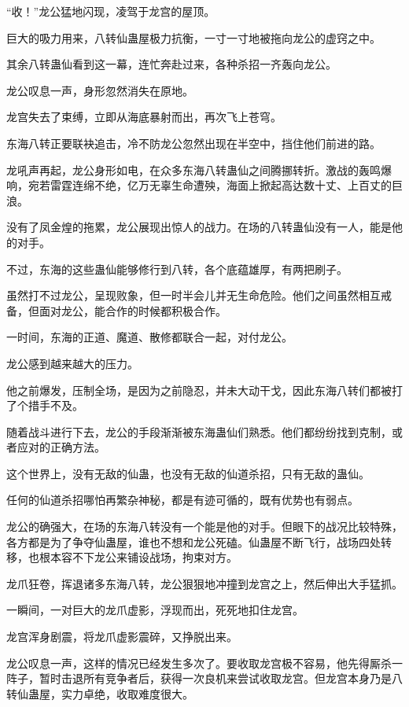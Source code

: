 
\begin{this_body}



“收！”龙公猛地闪现，凌驾于龙宫的屋顶。

巨大的吸力用来，八转仙蛊屋极力抗衡，一寸一寸地被拖向龙公的虚窍之中。

其余八转蛊仙看到这一幕，连忙奔赴过来，各种杀招一齐轰向龙公。

龙公叹息一声，身形忽然消失在原地。

龙宫失去了束缚，立即从海底暴射而出，再次飞上苍穹。

东海八转正要联袂追击，冷不防龙公忽然出现在半空中，挡住他们前进的路。

龙吼声再起，龙公身形如电，在众多东海八转蛊仙之间腾挪转折。激战的轰鸣爆响，宛若雷霆连绵不绝，亿万无辜生命遭殃，海面上掀起高达数十丈、上百丈的巨浪。

没有了凤金煌的拖累，龙公展现出惊人的战力。在场的八转蛊仙没有一人，能是他的对手。

不过，东海的这些蛊仙能够修行到八转，各个底蕴雄厚，有两把刷子。

虽然打不过龙公，呈现败象，但一时半会儿并无生命危险。他们之间虽然相互戒备，但面对龙公，能合作的时候都积极合作。

一时间，东海的正道、魔道、散修都联合一起，对付龙公。

龙公感到越来越大的压力。

他之前爆发，压制全场，是因为之前隐忍，并未大动干戈，因此东海八转们都被打了个措手不及。

随着战斗进行下去，龙公的手段渐渐被东海蛊仙们熟悉。他们都纷纷找到克制，或者应对的正确方法。

这个世界上，没有无敌的仙蛊，也没有无敌的仙道杀招，只有无敌的蛊仙。

任何的仙道杀招哪怕再繁杂神秘，都是有迹可循的，既有优势也有弱点。

龙公的确强大，在场的东海八转没有一个能是他的对手。但眼下的战况比较特殊，各方都是为了争夺仙蛊屋，谁也不想和龙公死磕。仙蛊屋不断飞行，战场四处转移，也根本容不下龙公来铺设战场，拘束对方。

龙爪狂卷，挥退诸多东海八转，龙公狠狠地冲撞到龙宫之上，然后伸出大手猛抓。

一瞬间，一对巨大的龙爪虚影，浮现而出，死死地扣住龙宫。

龙宫浑身剧震，将龙爪虚影震碎，又挣脱出来。

龙公叹息一声，这样的情况已经发生多次了。要收取龙宫极不容易，他先得厮杀一阵子，暂时击退所有竞争者后，获得一次良机来尝试收取龙宫。但龙宫本身乃是八转仙蛊屋，实力卓绝，收取难度很大。


\end{this_body}
